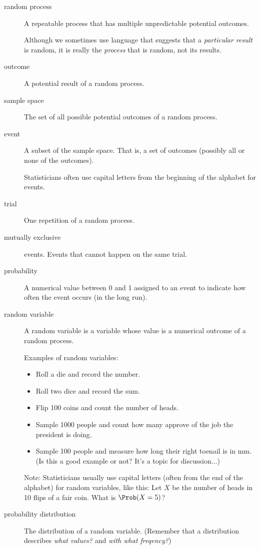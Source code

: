 \documentclass[twoside]{book}\usepackage[]{graphicx}\usepackage[]{xcolor}
\newcounter{example}[section]
\begin{document}
\begin{description}
\item[random process]
A repeatable process that has multiple unpredictable potential outcomes.

Although we sometimes use language that suggests that a \emph{particular result} is 
random, it is really the \emph{process} that is random, not its results.

\item[outcome]
A potential result of a random process.

\item[sample space]
The set of all possible potential outcomes of a random process.

\item[event]
A subset of the sample space.  
That is, a set of outcomes (possibly all or none of the outcomes).

Statisticians often use capital letters from the beginning of the alphabet
for events.

\item[trial] One repetition of a random process.

\item[mutually exclusive] events.
Events that cannot happen on the same trial.

\item[probability] A numerical value between 0 and 1 assigned to 
an event to indicate how often the event occurs (in the long run).

\item[random variable]
A random variable is a variable whose value is a numerical outcome of a random process.

Examples of random variables: 
\begin{itemize}
\item
Roll a die and record the number.
\item
Roll two dice and record the sum.
\item
Flip 100 coins and count the number of heads.
\item
Sample 1000 people and count how many approve of the job the president is doing.
\item Sample 100 people and measure how long their right toenail is in mm. (Is this a good example or not?  It's a topic for discussion...)
\end{itemize}

Note: Statisticians usually use capital letters (often from the end of the alphabet)
for random variables, like this:  
Let $X$ be the number of heads in 10 flips of a fair coin.  What is $\Prob(X=5)$?


\item[probability distribution]
The distribution of a random variable.
(Remember that a distribution describes \emph{what values?} and 
\emph{with what freqency?})
\end{description}
\end{document}
